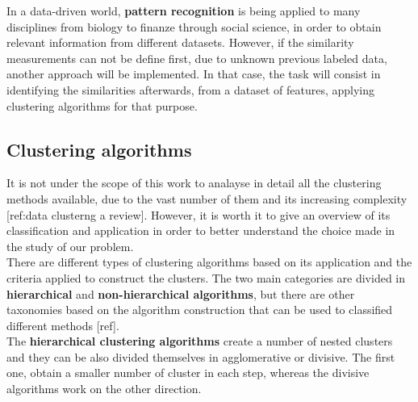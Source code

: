 

In a data-driven world, \textbf{pattern recognition} is being applied to many disciplines from biology to finanze through social science, in order to obtain relevant information from different datasets.
However, if the similarity measurements can not be define first, due to unknown previous labeled data, another approach will be implemented. In that case, the task will consist in identifying the similarities afterwards, from a dataset of features, applying clustering algorithms for that purpose.

\subsection{Clustering algorithms}

It is not under the scope of this work to analayse in detail all the clustering methods available, due to the vast number of them and its increasing complexity [ref:data clusterng a review]. However, it is worth it to give an overview of its classification and application in order to better understand the choice made in the study of our problem.\\

There are different types of clustering algorithms based on its application and the criteria applied to construct the clusters. The two main categories are divided in \textbf{hierarchical} and \textbf{non-hierarchical algorithms}, but there are other taxonomies based on the algorithm construction that can be used to classified different methods [ref].\\

The \textbf{hierarchical clustering algorithms} create a number of nested clusters and they can be also divided themselves in agglomerative or divisive. The first one, obtain a smaller number of cluster in each step, whereas the divisive algorithms work on the other direction.\\

